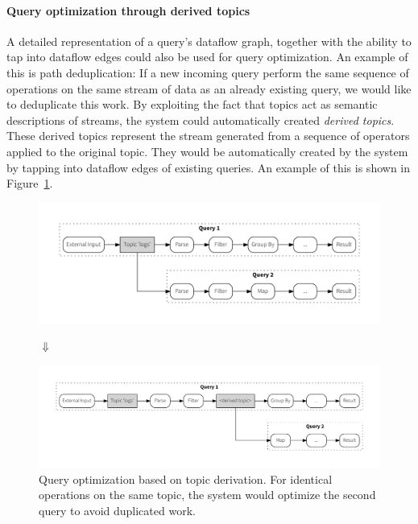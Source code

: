 \paragraph{Query optimization through derived topics}

A detailed representation of a query's dataflow graph, together with the ability
to tap into dataflow edges could also be used for query optimization. An example
of this is path deduplication: If a new incoming query perform the same
sequence of operations on the same stream of data as an already existing
query, we would like to deduplicate this work. By exploiting the fact that
topics act as semantic descriptions of streams, the system could automatically
created \emph{derived topics}. These derived topics represent the stream
generated from a sequence of operators applied to the original topic. They would
be automatically created by the system by tapping into dataflow edges of
existing queries. An example of this is shown in Figure~\ref{fig:queryoptimization}.

\begin{figure}[!htb]
  \includegraphics[scale=0.36]{figures/composition/q1q2_man}
  \vspace{-1.5em}
  \begin{center}
  $\Downarrow$
  \end{center}
  \vspace{-1.2em}
  \includegraphics[scale=0.36]{figures/composition/q1q2_auto}
  \caption{Query optimization based on topic derivation. For identical
  operations on the same topic, the system would optimize the second
  query to avoid duplicated work.}
  \label{fig:queryoptimization}
\end{figure}




